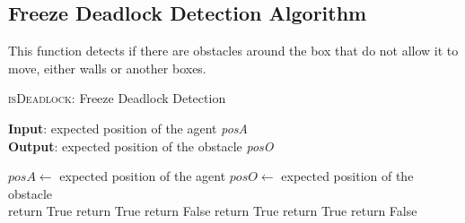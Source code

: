 \documentclass{article}
\begin{document}
\subsection{Freeze Deadlock Detection Algorithm}

This function detects if there are obstacles around the box that do not allow it to move, either walls or another boxes.

\begin{algorithm}
    \caption{\textsc{isDeadlock}: Freeze Deadlock Detection}\label{euclid}
    \hspace*{\algorithmicindent} \textbf{Input}: expected position of the agent \emph{posA} \\
    \hspace*{\algorithmicindent} \textbf{Output}: expected position of the obstacle \emph{posO} \\
    \begin{algorithmic}
    \State $posA \gets$ expected position of the agent
    \State $posO \gets$ expected position of the obstacle \\
            \State return True
            \State return True
        \Else
            \State return False
        \EndIf
            \State return True
            \State return True
        \Else
            \State return False
        \EndIf
    \EndIf 
    \end{algorithmic}
\end{algorithm}


\end{document}
